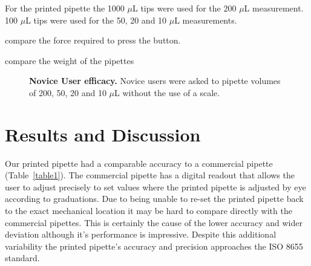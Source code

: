\documentclass[10pt,letterpaper]{article}
\begin{document}
For the printed pipette the 1000 $\mu$L tips were used for the 200 $\mu$L measurement. 100 $\mu$L tips were used for the 50, 20 and 10 $\mu$L measurements.

compare the force required to press the button.

compare the weight of the pipettes



\begin{figure}[h]
\caption{{\bf Novice User efficacy.}
Novice users were asked to pipette volumes of 200, 50, 20 and 10 $\mu$L without the use of a scale.}
\label{fig3}
\end{figure}


\section*{Results and Discussion}

Our printed pipette had a comparable accuracy to a commercial pipette (Table~\ref{table1}).
The commercial pipette has a digital readout that allows the user to adjust precisely to set values where the printed pipette is adjusted by eye according to graduations.
Due to being unable to re-set the printed pipette back to the exact mechanical location it may be hard to compare directly with the commercial pipettes.
This is certainly the cause of the lower accuracy and wider deviation although it's performance is impressive.
Despite this additional variability the printed pipette's accuracy and precision approaches the ISO 8655 standard.
\end{document}
